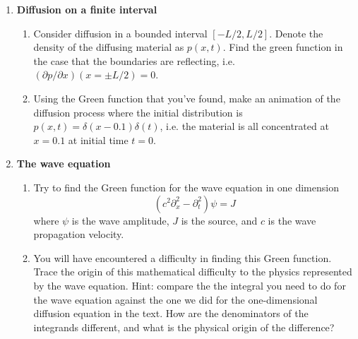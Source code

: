 
\begin{enumerate}
  \item \textbf{Diffusion on a finite interval}
    \begin{enumerate}
      \item Consider diffusion in a bounded interval $[-L/2, L/2]$. Denote the density of the diffusing material as $p(x, t)$. Find the green function in the case that the boundaries are reflecting, i.e. $(\partial p / \partial x)(x=\pm L/2) = 0$.
      \item Using the Green function that you've found, make an animation of the diffusion process where the initial distribution is $p(x, t) = \delta(x-0.1) \delta(t)$, i.e. the material is all concentrated at $x=0.1$ at initial time $t=0$.
    \end{enumerate}
  \item \textbf{The wave equation}
    \begin{enumerate}
      \item Try to find the Green function for the wave equation in one dimension
        \begin{equation}
          \left( c^2 \partial_x^2 - \partial_t^2 \right) \psi = J
        \end{equation}
        where $\psi$ is the wave amplitude, $J$ is the source, and $c$ is the wave propagation velocity.
      \item You will have encountered a difficulty in finding this Green function. Trace the origin of this mathematical difficulty to the physics represented by the wave equation. Hint: compare the the integral you need to do for the wave equation against the one we did for the one-dimensional diffusion equation in the text. How are the denominators of the integrands different, and what is the physical origin of the difference?
    \end{enumerate}
\end{enumerate}
